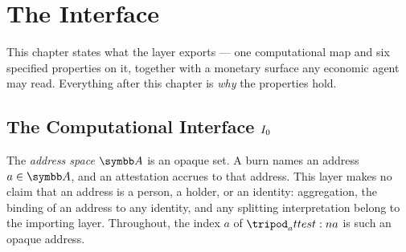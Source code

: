 \documentclass[../main.tex]{subfiles}
\begin{document}
%
%
%

\section{The Interface}
\label{sec:attestation:interface}

This chapter states what the layer exports --- one computational map and six specified
properties on it, together with a monetary surface any economic agent may read. Everything
after this chapter is \emph{why} the properties hold.

\subsection{The Computational Interface \texorpdfstring{$I\sb{0}$}{I0}}
\label{sec:interface:computational}

\begin{definition}
    \label{def:interface:address-space}
    The \emph{address space} $\addrspace$ is an opaque set. A burn names an address
    $a \in \addrspace$, and an attestation accrues to that address. This layer makes no
    claim that an address is a person, a holder, or an identity: aggregation, the binding
    of an address to any identity, and any splitting interpretation belong to the importing
    layer. Throughout, the index $a$ of $\attest{a}$ is such an opaque address.
\end{definition}
\end{document}
